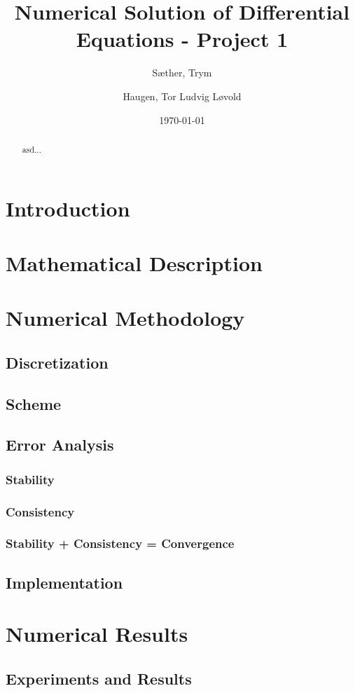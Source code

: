 \documentclass[a4paper,10pt]{article}
\title{Numerical Solution of Differential Equations - Project 1}
\author[1]{Sæther, Trym}
\author[1]{Haugen, Tor Ludvig Løvold}
\affil[1]{Department of Mathematical Sciences, NTNU}
\date{\today}
\begin{document}
\maketitle

\tableofcontents
\newpage

\begin{abstract}
    asd...
\end{abstract}

\section{Introduction}
\section{Mathematical Description}
\section{Numerical Methodology}
\subsection{Discretization}
\subsection{Scheme}
\subsection{Error Analysis}
\subsubsection{Stability}
\subsubsection{Consistency}
\subsubsection{Stability + Consistency = Convergence}
\subsection{Implementation}
\section{Numerical Results}
\subsection{Experiments and Results}
\end{document}
